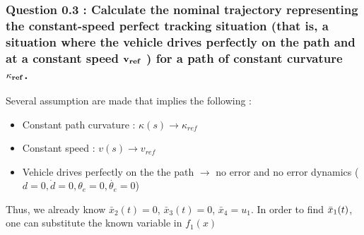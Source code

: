 \subsubsection*{Question 0.3 : Calculate the nominal trajectory representing the constant-speed perfect tracking situation (that is, a situation where the vehicle drives perfectly on the path and at a constant speed $\bold{v_{ref}}$ ) for a path of constant curvature $\bold{\kappa_{ref}}$.}
Several assumption are made that implies the following :
\begin{itemize}
    \item Constant path curvature : $\kappa(s) \longrightarrow \kappa_{ref}$
    \item Constant speed : $v(s) \longrightarrow v_{ref}$
    \item Vehicle drives perfectly on the the path $\longrightarrow$ no error and no error dynamics ($d=0, \dot{d}=0, \theta_e=0, \dot{\theta_e}=0$)
\end{itemize}
Thus, we already know $\bar{x}_2(t) = 0$, $\bar{x}_3(t) = 0$, $\bar{x}_4 = u_1$. In order to find $\Bar{x}_1(t)$, one can substitute the known variable in $f_1(x)$

